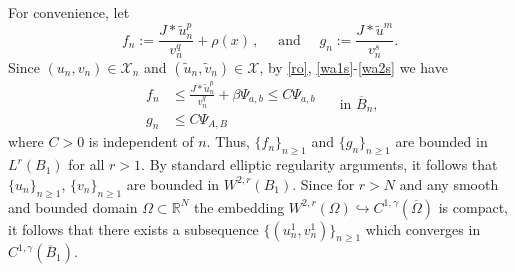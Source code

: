\documentclass[leqno,12pt]{article}
\newcommand{\R}{\mathbb R}
\numberwithin{equation}{section}
\begin{document}
For convenience, let
$$
f_n:=\frac{J * \widetilde u_n^p}{v_n^q}+\rho(x)\,,\quad\mbox{ and }\quad 
g_n:=\frac{J * \widetilde u^m}{v_n^s}.
$$
Since $(u_n, v_n)\in \mathscr{X}_n$ and $(\widetilde u_n, \widetilde v_n)\in \mathscr{X}$, by \eqref{ro}, \eqref{wa1s}-\eqref{wa2s} we have
$$
\begin{aligned}
f_n & \leq \frac{J * \widetilde u_n^p}{v_n^q}+\beta \Psi_{a,b}\leq C\Psi_{a,b}\\[0.05in]
g_n& \leq  C \Psi_{A,B}
\end{aligned}
\quad\mbox{ in }\overline B_n,
$$
where $C>0$ is independent of $n$. Thus, $\{f_n\}_{n\geq 1}$ and $\{g_n\}_{n\geq 1}$ are bounded in $L^r(B_1)$ for all $r>1$. By standard elliptic regularity arguments, it follows that $\{u_n\}_{n\geq 1}$, $\{v_n\}_{n\geq 1}$ are bounded in $W^{2,r}(B_1)$. Since for $r>N$ and any smooth and bounded domain $\Omega\subset \R^N$ the embedding $W^{2,r}(\Omega) \hookrightarrow C^{1,\gamma}(\overline\Omega)$ is compact, it follows that there exists a subsequence $\{(u_n^1, v_n^1)\}_{n\geq 1}$ which converges in $C^{1, \gamma}(\overline B_1)$. 
\end{document}
